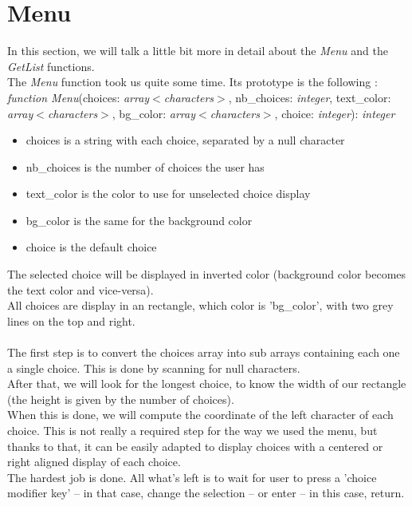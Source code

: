 \documentclass[book, backcover, english, nodocumentinfo]{upmethodology-document}
\begin{document}
	\section{Menu}
		In this section, we will talk a little bit more in detail about the \textit{Menu} and the \textit{GetList} functions.\\
		\newline
		The \textit{Menu} function took us quite some time. Its prototype is the following :\\
		\textit{function Menu}(choices: \textit{array$<$characters$>$}, nb\_choices: \textit{integer}, text\_color: \textit{array$<$characters$>$}, bg\_color: \textit{array$<$characters$>$}, choice: \textit{integer}): \textit{integer}\\
		\begin{itemize}
			\item{} choices is a string with each choice, separated by a null character
			\item{} nb\_choices is the number of choices the user has
			\item{} text\_color is the color to use for unselected choice display
			\item{} bg\_color is the same for the background color
			\item{} choice is the default choice
		\end{itemize}
		The selected choice will be displayed in inverted color (background color becomes the text color and vice-versa).\\
		All choices are display in an rectangle, which color is 'bg\_color', with two grey lines on the top and right.\\
		\newline
		\ov\\
		The first step is to convert the choices array into sub arrays containing each one a single choice. This is done by scanning for null characters.\\
		After that, we will look for the longest choice, to know the width of our rectangle (the height is given by the number of choices).\\
		When this is done, we will compute the coordinate of the left character of each choice. This is not really a required step for the way we used the menu, but thanks to that, it can be easily adapted to display choices with a centered or right aligned display of each choice.\\
		The hardest job is done. All what's left is to wait for user to press a 'choice modifier key' -- in that case, change the selection -- or enter -- in this case, return.\\
\end{document}
